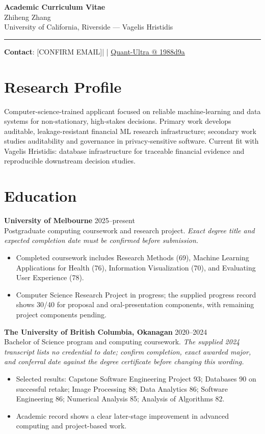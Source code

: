 \documentclass[11pt]{article}
\makeatletter
\newcommand{\ApplicantName}{Zhiheng Zhang}
\newcommand{\ApplicantEmail}{[CONFIRM EMAIL]}
\newcommand{\ApplicantPhone}{[CONFIRM PHONE]}
\newcommand{\ApplicantGitHub}{\href{https://github.com/zhiheng-zhang-Mera/Quant-Ultra/tree/1988d9a8530da91a8158de864d098ea869098923}{Quant-Ultra @ 1988d9a}}
\makeatother
\begin{document}
\begin{center}
{\LARGE\bfseries Academic Curriculum Vitae}\\[0.25em]
{\large \ApplicantName}\\
University of California, Riverside --- Vagelis Hristidis
\end{center}
\vspace{0.35em}\hrule\vspace{0.65em}

\textbf{Contact}: \ApplicantEmail\quad | \quad \ApplicantPhone\quad | \quad \ApplicantGitHub

\section*{Research Profile}
Computer-science-trained applicant focused on reliable machine-learning and data systems for non-stationary, high-stakes decisions. Primary work develops auditable, leakage-resistant financial ML research infrastructure; secondary work studies auditability and governance in privacy-sensitive software. Current fit with Vagelis Hristidis: database infrastructure for traceable financial evidence and reproducible downstream decision studies.

\section*{Education}
\textbf{University of Melbourne} \hfill 2025--present\\
Postgraduate computing coursework and research project. \textit{Exact degree title and expected completion date must be confirmed before submission.}
\begin{itemize}
\item Completed coursework includes Research Methods (69), Machine Learning Applications for Health (76), Information Visualization (70), and Evaluating User Experience (78).
\item Computer Science Research Project in progress; the supplied progress record shows 30/40 for proposal and oral-presentation components, with remaining project components pending.
\end{itemize}

\textbf{The University of British Columbia, Okanagan} \hfill 2020--2024\\
Bachelor of Science program and computing coursework. \textit{The supplied 2024 transcript lists no credential to date; confirm completion, exact awarded major, and conferral date against the degree certificate before changing this wording.}
\begin{itemize}
\item Selected results: Capstone Software Engineering Project 93; Databases 90 on successful retake; Image Processing 88; Data Analytics 86; Software Engineering 86; Numerical Analysis 85; Analysis of Algorithms 82.
\item Academic record shows a clear later-stage improvement in advanced computing and project-based work.
\end{itemize}
\end{document}
